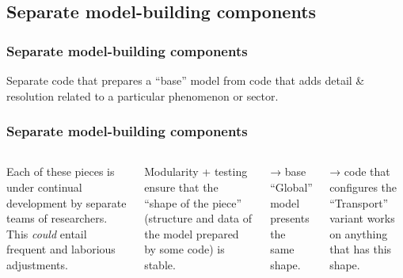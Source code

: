 \documentclass[12pt,aspectratio=169]{beamer}
\newcommand{\side}[1]{
(0.0,#1*0.00) .. controls (0.0,#1* 0.00) and (0.4,#1*-0.04) ..
(0.4,#1*0.04) .. controls (0.4,#1* 0.11) and (0.2,#1* 0.26) ..
(0.5,#1*0.26) .. controls (0.8,#1* 0.26) and (0.6,#1* 0.11) ..
(0.6,#1*0.04) .. controls (0.6,#1*-0.04) and (1.0,#1* 0.00) ..
(1.0,#1*0.00)
}
\newcommand{\piece}[2][black]{
\begin{scope}[scale=2, shift={($(#2) - (0.25,0.48)$)}]
  \path [draw = #1, ultra thick, line cap = round]
  \side{1}  %
  [rotate around={90:(0.5,0.5)}] \side{1}    %
  [rotate around={180:(0.5,0.5)}] \side{-1}  %
  [rotate around={270:(0.5,0.5)}] \side{-1};  %
\end{scope}
}
\begin{document}
\subsection{Separate model-building components}
\begin{frame}
\frametitle{Separate model-building components}

Separate code that prepares a “base” model from code that adds detail \& resolution related to a particular phenomenon or sector.

\bigskip
{}

\end{frame}

\begin{frame}
\frametitle{Separate model-building components}

\begin{columns}
\column{0.3\paperwidth}

\column{0.6\paperwidth}
Each of these pieces is under continual development by separate teams of researchers.
This \emph{could} entail frequent and laborious adjustments.

\bigskip
\pause Modularity + testing ensure that the “shape of the piece” (structure and data of the model prepared by some code) is stable.

\smallskip
\pause → base “Global” model presents the same shape.

\pause → code that configures the “Transport” variant works on anything that has this shape.
\end{columns}
\end{frame}
\end{document}
